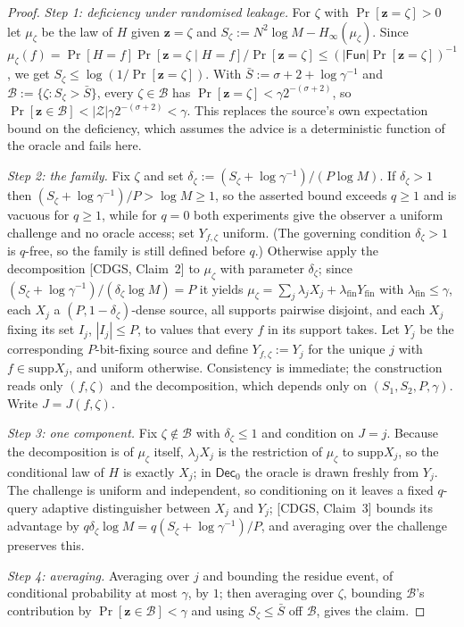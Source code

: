 \documentclass{aicr-solution}
\newcommand{\Fun}{\mathsf{Fun}}
\newcommand{\Dec}{\mathsf{Dec}}
\newcommand{\Prob}[1]{\Pr\!\left[#1\right]}
\newcommand{\vz}{\mathbf{z}}
\newcommand{\supp}{\mathrm{supp}}
\begin{document}
\begin{proof}
\emph{Step 1: deficiency under randomised leakage.} For $\zeta$ with
$\Prob{\vz=\zeta}>0$ let $\mu_\zeta$ be the law of $H$ given $\vz=\zeta$ and
$S_\zeta:=N^{2}\log M-H_\infty(\mu_\zeta)$. Since
$\mu_\zeta(f)=\Prob{H=f}\Prob{\vz=\zeta\mid H=f}/\Prob{\vz=\zeta}\le(|\Fun|\Prob{\vz=\zeta})^{-1}$,
we get $S_\zeta\le\log(1/\Prob{\vz=\zeta})$. With
$\bar S:=\sigma+2+\log\gamma^{-1}$ and $\mathcal B:=\{\zeta:S_\zeta>\bar S\}$,
every $\zeta\in\mathcal B$ has $\Prob{\vz=\zeta}<\gamma2^{-(\sigma+2)}$, so
$\Prob{\vz\in\mathcal B}<|\mathcal Z|\gamma2^{-(\sigma+2)}<\gamma$. This replaces
the source's own expectation bound on the deficiency, which assumes the advice is
a deterministic function of the oracle and fails here.

\emph{Step 2: the family.} Fix $\zeta$ and set
$\delta_\zeta:=(S_\zeta+\log\gamma^{-1})/(P\log M)$. If $\delta_\zeta>1$ then
$(S_\zeta+\log\gamma^{-1})/P>\log M\ge1$, so the asserted bound exceeds
$q\ge1$ and is vacuous for $q\ge1$, while for $q=0$ both experiments give the
observer a uniform challenge and no oracle access; set $Y_{f,\zeta}$ uniform.
(The governing condition $\delta_\zeta>1$ is $q$-free, so the family is still
defined before $q$.) Otherwise apply the decomposition [CDGS, Claim~2] to
$\mu_\zeta$ with parameter $\delta_\zeta$; since
$(S_\zeta+\log\gamma^{-1})/(\delta_\zeta\log M)=P$ it yields
$\mu_\zeta=\sum_j\lambda_jX_j+\lambda_{\mathrm{fin}}Y_{\mathrm{fin}}$ with
$\lambda_{\mathrm{fin}}\le\gamma$, each $X_j$ a $(P,1-\delta_\zeta)$-dense
source, all supports pairwise disjoint, and each $X_j$ fixing its set $I_j$,
$|I_j|\le P$, to values that every $f$ in its support takes. Let $Y_j$ be the
corresponding $P$-bit-fixing source and define $Y_{f,\zeta}:=Y_j$ for the unique
$j$ with $f\in\supp X_j$, and uniform otherwise. Consistency is immediate; the
construction reads only $(f,\zeta)$ and the decomposition, which depends only on
$(S_1,S_2,P,\gamma)$. Write $J=J(f,\zeta)$.

\emph{Step 3: one component.} Fix $\zeta\notin\mathcal B$ with $\delta_\zeta\le1$
and condition on $J=j$. Because the decomposition is of $\mu_\zeta$ itself,
$\lambda_jX_j$ is the restriction of $\mu_\zeta$ to $\supp X_j$, so the
conditional law of $H$ is exactly $X_j$; in $\Dec_0$ the oracle is drawn freshly
from $Y_j$. The challenge is uniform and independent, so conditioning on it
leaves a fixed $q$-query adaptive distinguisher between $X_j$ and $Y_j$;
[CDGS, Claim~3] bounds its advantage by
$q\delta_\zeta\log M=q(S_\zeta+\log\gamma^{-1})/P$, and averaging over the
challenge preserves this.

\emph{Step 4: averaging.} Averaging over $j$ and bounding the residue event, of
conditional probability at most $\gamma$, by $1$; then averaging over $\zeta$,
bounding $\mathcal B$'s contribution by $\Prob{\vz\in\mathcal B}<\gamma$ and
using $S_\zeta\le\bar S$ off $\mathcal B$, gives the claim.
\end{proof}
\end{document}
